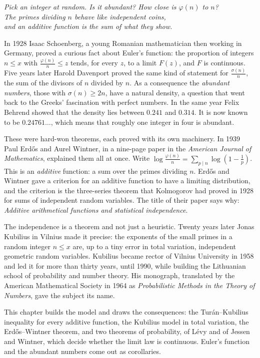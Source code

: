 \begin{center}\itshape
Pick an integer at random. Is it abundant? How close is $\varphi(n)$ to $n$?\\
The primes dividing $n$ behave like independent coins,\\
and an additive function is the sum of what they show.
\end{center}

In 1928 Isaac Schoenberg, a young Romanian mathematician then working in Germany, proved a curious fact about Euler's function: the proportion of integers $n\le x$ with $\frac{\varphi(n)}n\le z$ tends, for every $z$, to a limit $F(z)$, and $F$ is continuous. Five years later Harold Davenport proved the same kind of statement for $\frac{\sigma(n)}n$, the sum of the divisors of $n$ divided by $n$. As a consequence the \emph{abundant numbers}, those with $\sigma(n)\ge2n$, have a natural density, a question that went back to the Greeks' fascination with perfect numbers. In the same year Felix Behrend showed that the density lies between $0.241$ and $0.314$. It is now known to be $0.24761\ldots$, which means that roughly one integer in four is abundant.

These were hard-won theorems, each proved with its own machinery. In 1939 Paul Erd\H{o}s and Aurel Wintner, in a nine-page paper in the \emph{American Journal of Mathematics}, explained them all at once. Write $\log\frac{\varphi(n)}n=\sum_{p\mid n}\log(1-\frac1p)$. This is an \emph{additive} function: a sum over the primes dividing $n$. Erd\H{o}s and Wintner gave a criterion for an additive function to have a limiting distribution, and the criterion is the three-series theorem that Kolmogorov had proved in 1928 for sums of independent random variables. The title of their paper says why: \emph{Additive arithmetical functions and statistical independence}.

The independence is a theorem and not just a heuristic. Twenty years later Jonas Kubilius in Vilnius made it precise: the exponents of the small primes in a random integer $n\le x$ are, up to a tiny error in total variation, independent geometric random variables. Kubilius became rector of Vilnius University in 1958 and led it for more than thirty years, until 1990, while building the Lithuanian school of probability and number theory. His monograph, translated by the American Mathematical Society in 1964 as \emph{Probabilistic Methods in the Theory of Numbers}, gave the subject its name.

This chapter builds the model and draws the consequences: the Tur\'an--Kubilius inequality for every additive function, the Kubilius model in total variation, the Erd\H{o}s--Wintner theorem, and two theorems of probability, of L\'evy and of Jessen and Wintner, which decide whether the limit law is continuous. Euler's function and the abundant numbers come out as corollaries.

